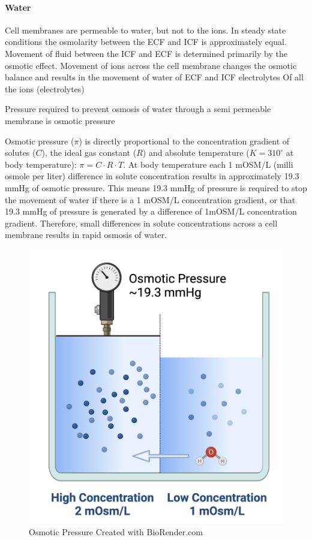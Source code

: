 \paragraph{Water}

Cell membranes are permeable to water, but not to the ions. In steady state conditions the osmolarity between the ECF and ICF is approximately equal. Movement of fluid between the ICF and ECF is determined primarily by the osmotic effect. Movement of ions across the cell membrane changes the osmotic balance and results in the movement of water of ECF and ICF electrolytes Of all the ions (electrolytes)

Pressure required to prevent osmosis of water through a semi permeable membrane is osmotic pressure

Osmotic pressure ($\pi$) is directly proportional to the concentration gradient of solutes ($C$), the ideal gas constant ($R$) and absolute temperature ($K = 310^{\circ}$ at body temperature): $\pi = C \cdot R \cdot T$. At body temperature each 1 mOSM/L (milli osmole per liter) difference in solute concentration results in approximately 19.3 mmHg of osmotic pressure. This means 19.3 mmHg of pressure is required to stop the movement of water if there is a 1 mOSM/L concentration gradient, or that 19.3 mmHg of pressure is generated by a difference of 1mOSM/L concentration gradient. Therefore, small differences in solute concentrations across a cell membrane results in rapid osmosis of water.

\begin{figure}[!h]
    \centering
    \includegraphics[width=1\linewidth]{./figure/osmotic_pressure.png}
    \caption{Osmotic Pressure \footnotesize{Created with BioRender.com}}
    \label{fig:osmotic_pressure}
\end{figure}

